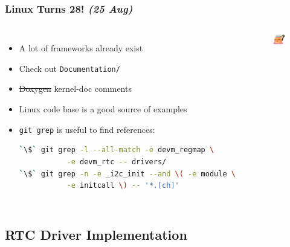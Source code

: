 \begin{frame}[containsverbatim]
  \frametitle{Linux Turns 28! \textit{(25 Aug)}}
  \begin{columns}
      \begin{itemize}
        \item A lot of frameworks already exist
        \item Check out \texttt{Documentation/}
        \item \sout{Doxygen} kernel-doc comments
        \item Linux code base is a good source of examples
        \item \texttt{git grep} is useful to find references:
          \begin{lstlisting}[language=bash]
`\$` git grep -l --all-match -e devm_regmap \
           -e devm_rtc -- drivers/
`\$` git grep -n -e _i2c_init --and \( -e module \
           -e initcall \) -- '*.[ch]'
          \end{lstlisting}
      \end{itemize}
      \begin{figure}
        \centering
        \includegraphics[scale=0.4]{images/linux-bday.png}
      \end{figure}
      \vspace*{-6mm}
  \end{columns}
\end{frame}


\subsection{RTC Driver Implementation}

